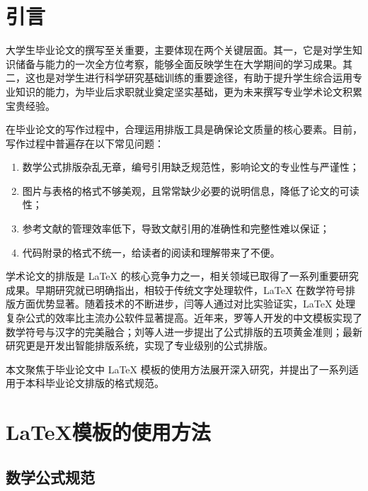 \documentclass{JYU} %
\begin{document}
	\cleardoublepage %
	\tableofcontents %
	
	\cleardoublepage %
	\setcounter{page}{1} %
    
\section{引言}

大学生毕业论文的撰写至关重要，主要体现在两个关键层面。其一，它是对学生知识储备与能力的一次全方位考察，能够全面反映学生在大学期间的学习成果。其二，这也是对学生进行科学研究基础训练的重要途径，有助于提升学生综合运用专业知识的能力，为毕业后求职就业奠定坚实基础，更为未来撰写专业学术论文积累宝贵经验。

在毕业论文的写作过程中，合理运用排版工具是确保论文质量的核心要素。目前，写作过程中普遍存在以下常见问题：
\begin{enumerate}[label=(\arabic*)]
	\item 数学公式排版杂乱无章，编号引用缺乏规范性，影响论文的专业性与严谨性；
	\item 图片与表格的格式不够美观，且常常缺少必要的说明信息，降低了论文的可读性；
	\item 参考文献的管理效率低下，导致文献引用的准确性和完整性难以保证；
	\item 代码附录的格式不统一，给读者的阅读和理解带来了不便。
\end{enumerate}

学术论文的排版是 \LaTeX{} 的核心竞争力之一，相关领域已取得了一系列重要研究成果。早期研究就已明确指出，相较于传统文字处理软件，\LaTeX{} 在数学符号排版方面优势显著\cite{KJYU201010018}。随着技术的不断进步，闫等人\cite{BJXB201303037}通过对比实验证实，\LaTeX{} 处理复杂公式的效率比主流办公软件显著提高。近年来，罗等人\cite{JYKQ201611011}开发的中文模板实现了数学符号与汉字的完美融合；刘等人\cite{DNZS201933114}进一步提出了公式排版的五项黄金准则；最新研究\cite{JYRJ202212005}更是开发出智能排版系统，实现了专业级别的公式排版。

本文聚焦于毕业论文中 \LaTeX{} 模板的使用方法展开深入研究，并提出了一系列适用于本科毕业论文排版的格式规范。 

\section{\LaTeX{}模板的使用方法}

\subsection{数学公式规范}
\end{document}
